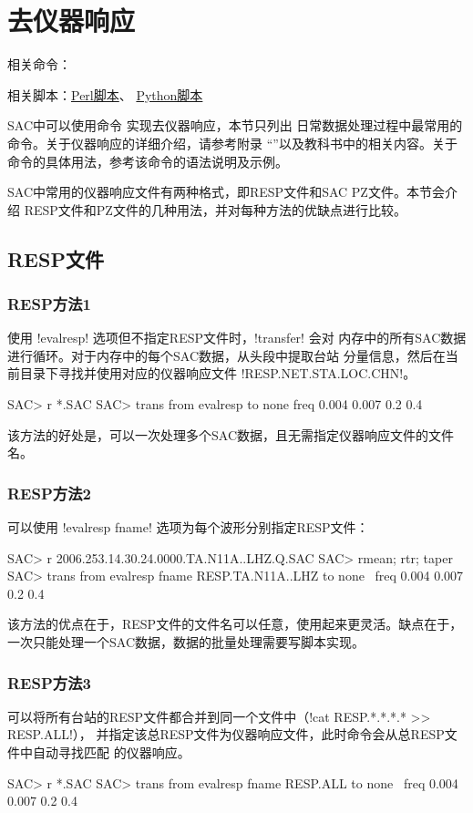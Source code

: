 \section{去仪器响应}
\label{sec:instrument-response}
相关命令：

相关脚本：\hyperref[subsec:transfer-perl]{Perl脚本}、
          \hyperref[subsec:transfer-python]{Python脚本}

SAC中可以使用命令  实现去仪器响应，本节只列出
日常数据处理过程中最常用的命令。关于仪器响应的详细介绍，请参考附录
``''以及教科书中的相关内容。关于 
命令的具体用法，参考该命令的语法说明及示例。

SAC中常用的仪器响应文件有两种格式，即RESP文件和SAC PZ文件。本节会介绍
RESP文件和PZ文件的几种用法，并对每种方法的优缺点进行比较。

\subsection{RESP文件}

\subsubsection{RESP方法1}
使用 !evalresp! 选项但不指定RESP文件时，!transfer! 会对
内存中的所有SAC数据进行循环。对于内存中的每个SAC数据，从头段中提取台站
分量信息，然后在当前目录下寻找并使用对应的仪器响应文件
!RESP.NET.STA.LOC.CHN!。
\begin{SACCode}
SAC> r *.SAC
SAC> trans from evalresp to none freq 0.004 0.007 0.2 0.4
\end{SACCode}
该方法的好处是，可以一次处理多个SAC数据，且无需指定仪器响应文件的文件名。

\subsubsection{RESP方法2}
可以使用 !evalresp fname! 选项为每个波形分别指定RESP文件：
\begin{SACCode}
SAC> r 2006.253.14.30.24.0000.TA.N11A..LHZ.Q.SAC
SAC> rmean; rtr; taper
SAC> trans from evalresp fname RESP.TA.N11A..LHZ to none \
                                freq 0.004 0.007 0.2 0.4
\end{SACCode}
该方法的优点在于，RESP文件的文件名可以任意，使用起来更灵活。缺点在于，
一次只能处理一个SAC数据，数据的批量处理需要写脚本实现。

\subsubsection{RESP方法3}
可以将所有台站的RESP文件都合并到同一个文件中（!cat RESP.*.*.*.* >> RESP.ALL!），
并指定该总RESP文件为仪器响应文件，此时命令会从总RESP文件中自动寻找匹配
的仪器响应。
\begin{SACCode}
SAC> r *.SAC
SAC> trans from evalresp fname RESP.ALL to none \
                            freq 0.004 0.007 0.2 0.4
\end{SACCode}


